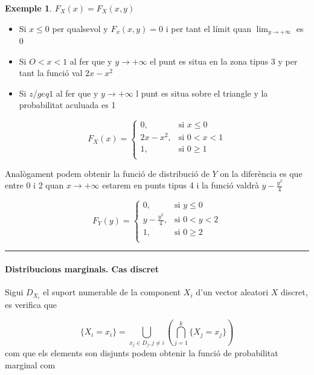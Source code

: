 \documentclass[
  catalan,
]{article}
\theoremstyle{definition}
\theoremstyle{definition}
\newtheorem{example}{Exemple}[section]
\theoremstyle{definition}
\theoremstyle{definition}
\theoremstyle{remark}
\begin{document}
\begin{example}
\(F_{X}(x)= F_X(x,y)\)

\begin{itemize}
\item
  Si \(x\leq 0\) per qualsevol y \(F_x(x,y)=0\) i per tant el límit quan \(\lim_{y \rightarrow +\infty}\) es 0
\item
  Si \(O<x<1\) al fer que y \(y \rightarrow+\infty\) el punt es situa en la zona tipus 3 y per tant la funció val \(2x-x^2\)
\item
  Si \(z /geq 1\) al fer que y \(y \rightarrow+\infty\) l punt es situa sobre el triangle y la probabilitat aculuada es 1
\end{itemize}

\[
F_{X}(x)=
\begin{cases}
0,              & \text{si } x \leq 0  \\
2x-x^2,         & \text{si }  0< x < 1 \\
1,              & \text{si }  0 \geq 1 \\
\end{cases}
\]

Analògament podem obtenir la funció de distribució de \(Y\) on la diferència es que entre 0 i 2 quan \(x \rightarrow+\infty\) estarem en punts tipus 4 i la funció valdrà \(y-\frac {y^2}{4}\)

\[
F_{Y}(y)=
\begin{cases}
0,              & \text{si } y \leq 0  \\
y-\frac {y^2}{4},         & \text{si }  0< y < 2 \\
1,              & \text{si }  0 \geq 2 \\
\end{cases}
\]
\end{example}

\begin{center}\rule{0.5\linewidth}{0.5pt}\end{center}

\paragraph{Distribucions marginals. Cas discret}\label{distribucions-marginals.-cas-discret}

Sigui \(D_{X_i}\) el suport numerable de la component \(X_i\) d'un vector aleatori \(X\) discret, es verifica que

\[
  \{ X_i=x_i  \}= \bigcup_{x_j \in D_j, j \neq  i } \left(\bigcap_{j=1}^k \{ X_j=x_j \}\right)
\]
com que els elements son disjunts podem obtenir la funció de probabilitat marginal com
\end{document}
